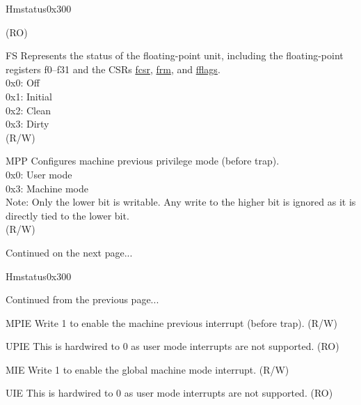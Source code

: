 \begin{register}{H}{mstatus}{0x300}
\begin{regdesc}
\begin{reglist}
(RO) \\
\label{fielddesc:MSTATUS_FS}\item [FS] Represents the status of the floating-point unit, including the floating-point registers f0–f31 and the CSRs \hyperref[regdesc:FCSR]{fcsr}, \hyperref[regdesc:FCSR]{frm}, and \hyperref[regdesc:FFLAGS]{fflags}. \\
0x0: Off\\
0x1: Initial\\
0x2: Clean\\
0x3: Dirty\\
(R/W)
\label{fielddesc:MSTATUSMPP}\item [MPP] Configures machine previous privilege mode (before trap).\\
0x0: User mode\\
0x3: Machine mode\\
Note: Only the lower bit is writable. Any write to the higher bit is ignored as it is directly tied to the lower bit.\\
(R/W)
\item [Continued on the next page...]
\end{reglist}\end{regdesc}
\end{register}
\addtocounter{Regfloat}{-1}
\begin{register}{H}{mstatus}{0x300}
\begin{regdesc}\begin{reglist}
\item [Continued from the previous page...]
\label{fielddesc:MSTATUSMPIE}\item [MPIE] Write 1 to enable the machine previous interrupt (before trap). (R/W)
\label{fielddesc:MSTATUSUPIE}\item [UPIE] This is hardwired to 0 as user mode interrupts are not supported. (RO)
\label{fielddesc:MSTATUSMIE}\item [MIE] Write 1 to enable the global machine mode interrupt. (R/W)
\label{fielddesc:MSTATUSUIE}\item [UIE] This is hardwired to 0 as user mode interrupts are not supported. (RO)
\end{reglist}\end{regdesc}
\end{register}

